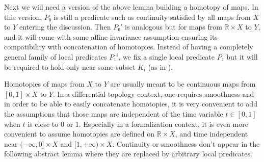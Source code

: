 Next we will need a version of the above lemma building a homotopy of maps.
In this version, $P₀$ is still a predicate such as continuity satisfied by
all maps from $X$ to $Y$ entering the discussion. Then $P₀'$ is analogous but for
maps from $ℝ × X$ to $Y$, and it will come with some affine invariance assumption
ensuring its compatibility with concatenation of homotopies.
Instead of having a completely general family of local predicates
$P₁^i$, we fix a single local predicate $P₁$ but it will be required to hold only
near some subset $K_i$ (as in ).

Homotopies of maps from $X$ to $Y$ are usually meant to be continuous maps from
$[0, 1] × X$ to $Y$. In a differential topology context, one requires
smoothness and in order to be able to easily concatenate homotopies, it is very
convenient to add the assumptions that those maps are independent of the time
variable $t ∈ [0, 1]$ when $t$ is close to $0$ or $1$. Especially in a
formalization context, it is even more convenient to assume homotopies are defined on
$ℝ × X$, and time independent near $(-∞, 0] × X$ and $[1, +∞) × X$. Continuity or
smoothness don't appear in the following abstract lemma where they are replaced by
arbitrary local predicates.

